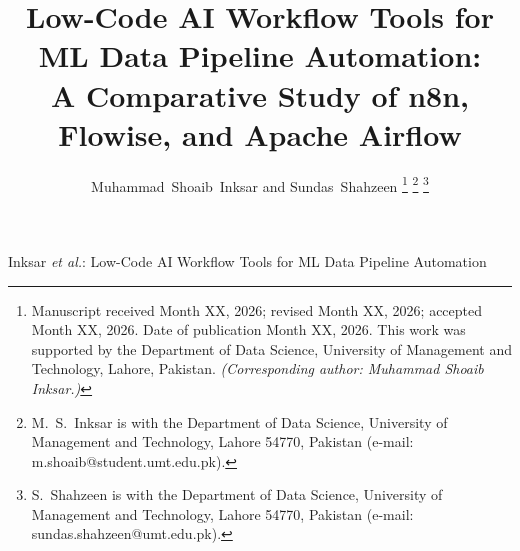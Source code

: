 \documentclass[journal]{IEEEtran}
\begin{document}
\title{Low-Code AI Workflow Tools for ML Data Pipeline Automation:\\
A Comparative Study of n8n, Flowise, and Apache Airflow}

\author{Muhammad~Shoaib~Inksar and Sundas~Shahzeen%
  \thanks{Manuscript received Month XX, 2026; revised Month XX, 2026;
    accepted Month XX, 2026. Date of publication Month XX, 2026.
    This work was supported by the Department of Data Science,
    University of Management and Technology, Lahore, Pakistan.
    \emph{(Corresponding author: Muhammad Shoaib Inksar.)}}%
  \thanks{M.~S.~Inksar is with the Department of Data Science,
    University of Management and Technology, Lahore 54770, Pakistan
    (e-mail: m.shoaib@student.umt.edu.pk).}%
  \thanks{S.~Shahzeen is with the Department of Data Science,
    University of Management and Technology, Lahore 54770, Pakistan
    (e-mail: sundas.shahzeen@umt.edu.pk).}}

%
{Inksar \MakeLowercase{\textit{et al.}}: Low-Code AI Workflow Tools
  for ML Data Pipeline Automation}

\maketitle
\end{document}
